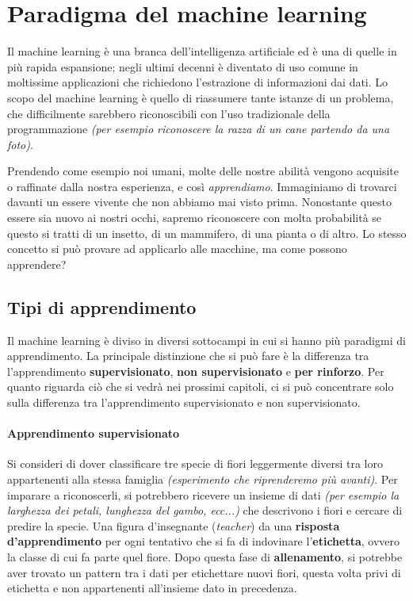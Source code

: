 \documentclass[12pt, twoside, letterpaper]{report}
\begin{document}
		\section{Paradigma del machine learning}
			Il machine learning è una branca dell'intelligenza artificiale ed è una di quelle in più rapida espansione; negli ultimi decenni è diventato di uso comune in moltissime applicazioni che richiedono l'estrazione di informazioni dai dati. Lo scopo del machine learning è quello di riassumere tante istanze di un problema, che difficilmente sarebbero riconoscibili con l'uso tradizionale della programmazione \textit{(per esempio riconoscere la razza di un cane partendo da una foto)}.   
			
			Prendendo come esempio noi umani, molte delle nostre abilità vengono acquisite o raffinate dalla nostra esperienza, e così \textit{apprendiamo}. Immaginiamo di trovarci davanti un essere vivente che non abbiamo mai visto prima. Nonostante questo essere sia nuovo ai nostri occhi, sapremo riconoscere con molta probabilità se questo si tratti di un insetto, di un mammifero, di una pianta o di altro. Lo stesso concetto si può provare ad applicarlo alle macchine, ma come possono apprendere? 
			
			\subsection{Tipi di apprendimento} Il machine learning è diviso in diversi sottocampi in cui si hanno più paradigmi di apprendimento. La principale distinzione che si può fare è la differenza tra l'apprendimento \textbf{supervisionato}, \textbf{non supervisionato} e \textbf{per rinforzo}. Per quanto riguarda ciò che si vedrà nei prossimi capitoli, ci si può concentrare solo sulla differenza tra l'apprendimento supervisionato e non supervisionato.
			
				\paragraph{Apprendimento supervisionato} Si consideri di dover classificare tre specie di fiori leggermente diversi tra loro appartenenti alla stessa famiglia \textit{(esperimento che riprenderemo più avanti)}. Per imparare a riconoscerli, si potrebbero ricevere un insieme di dati \textit{(per esempio la larghezza dei petali, lunghezza del gambo, ecc...)} che descrivono i fiori e cercare di predire la specie. Una figura d'insegnante (\textit{teacher}) da una \textbf{risposta d'apprendimento} per ogni tentativo che si fa di indovinare l'\textbf{etichetta}, ovvero la classe di cui fa parte quel fiore. Dopo questa fase di \textbf{allenamento}, si potrebbe aver trovato un pattern tra i dati per etichettare nuovi fiori, questa volta privi di etichetta e non appartenenti all'insieme dato in precedenza. 
										
\end{document}
